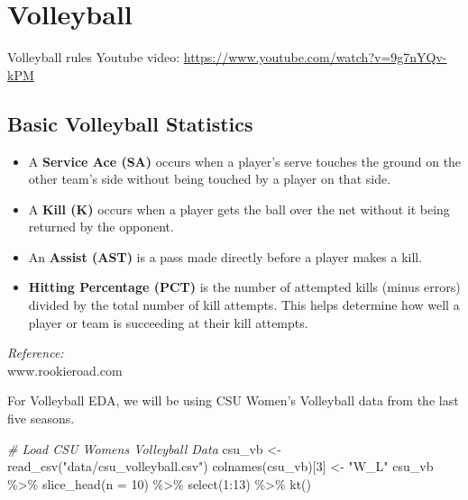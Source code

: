 \documentclass[
  11pt,
]{book}
\newenvironment{Shaded}{\begin{snugshade}}{\end{snugshade}}
\newcommand{\AttributeTok}[1]{\textcolor[rgb]{0.77,0.63,0.00}{#1}}
\newcommand{\CommentTok}[1]{\textcolor[rgb]{0.56,0.35,0.01}{\textit{#1}}}
\newcommand{\DecValTok}[1]{\textcolor[rgb]{0.00,0.00,0.81}{#1}}
\newcommand{\FunctionTok}[1]{\textcolor[rgb]{0.00,0.00,0.00}{#1}}
\newcommand{\NormalTok}[1]{#1}
\newcommand{\OtherTok}[1]{\textcolor[rgb]{0.56,0.35,0.01}{#1}}
\newcommand{\SpecialCharTok}[1]{\textcolor[rgb]{0.00,0.00,0.00}{#1}}
\newcommand{\StringTok}[1]{\textcolor[rgb]{0.31,0.60,0.02}{#1}}
\providecommand{\tightlist}{%
  \setlength{\itemsep}{0pt}\setlength{\parskip}{0pt}}
\theoremstyle{definition}
\theoremstyle{definition}
\theoremstyle{definition}
\theoremstyle{definition}
\theoremstyle{remark}
\begin{document}
\newpage

\hypertarget{volleyball}{%
\section{Volleyball}\label{volleyball}}

Volleyball rules Youtube video: \url{https://www.youtube.com/watch?v=9g7nYQv-kPM}

\hypertarget{basic-volleyball-statistics}{%
\subsection{Basic Volleyball Statistics}\label{basic-volleyball-statistics}}

\begin{itemize}
\tightlist
\item
  A \textbf{Service Ace (SA)} occurs when a player's serve touches the ground on the other team's side without being touched by a player on that side.
\item
  A \textbf{Kill (K)} occurs when a player gets the ball over the net without it being returned by the opponent.
\item
  An \textbf{Assist (AST)} is a pass made directly before a player makes a kill.
\item
  \textbf{Hitting Percentage (PCT)} is the number of attempted kills (minus errors) divided by the total number of kill attempts. This helps determine how well a player or team is succeeding at their kill attempts.
\end{itemize}

\emph{Reference:}\\
www.rookieroad.com

For Volleyball EDA, we will be using CSU Women's Volleyball data from the last five seasons.

\begin{Shaded}
\begin{Highlighting}[]
\CommentTok{\# Load CSU Women\textquotesingle{}s Volleyball Data}
\NormalTok{csu\_vb }\OtherTok{\textless{}{-}} \FunctionTok{read\_csv}\NormalTok{(}\StringTok{"data/csu\_volleyball.csv"}\NormalTok{)}
\FunctionTok{colnames}\NormalTok{(csu\_vb)[}\DecValTok{3}\NormalTok{] }\OtherTok{\textless{}{-}} \StringTok{"W\_L"}
\NormalTok{csu\_vb }\SpecialCharTok{\%\textgreater{}\%}
    \FunctionTok{slice\_head}\NormalTok{(}\AttributeTok{n =} \DecValTok{10}\NormalTok{) }\SpecialCharTok{\%\textgreater{}\%}
    \FunctionTok{select}\NormalTok{(}\DecValTok{1}\SpecialCharTok{:}\DecValTok{13}\NormalTok{) }\SpecialCharTok{\%\textgreater{}\%}
    \FunctionTok{kt}\NormalTok{()}
\end{Highlighting}
\end{Shaded}
\end{document}
